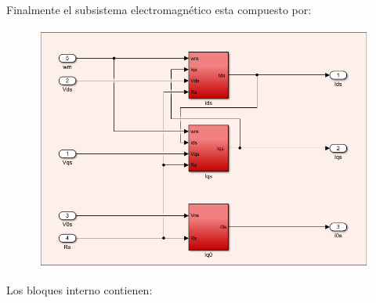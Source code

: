 \documentclass{article}
\begin{document}
Finalmente el subsistema electromagnético esta compuesto por:

\begin{figure}[H]
    \centering
    \includegraphics[width=1\textwidth]{sub_electromagentico.png}
\end{figure}

Los bloques interno contienen:
\end{document}
